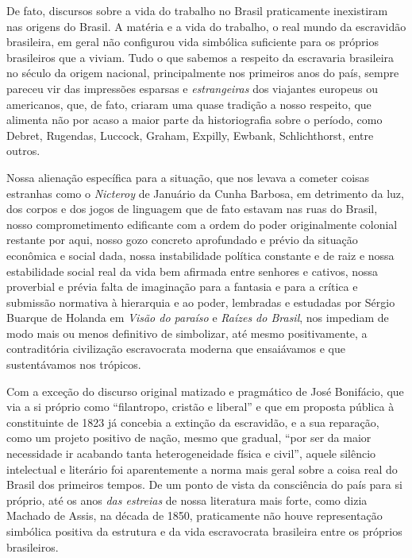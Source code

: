 De fato, discursos sobre a vida do trabalho no Brasil praticamente
inexistiram nas origens do Brasil. A matéria e a vida do trabalho, o
real mundo da escravidão brasileira, em geral não configurou vida
simbólica suficiente para os próprios brasileiros que a viviam. Tudo o
que sabemos a respeito da escravaria brasileira no século da origem
nacional, principalmente nos primeiros anos do país, sempre pareceu vir
das impressões esparsas e \emph{estrangeiras} dos viajantes europeus ou
americanos, que, de fato, criaram uma quase tradição a nosso respeito,
que alimenta não por acaso a maior parte da historiografia sobre o
período, como Debret, Rugendas, Luccock, Graham, Expilly, Ewbank,
Schlichthorst, entre outros.

Nossa alienação específica para a situação, que nos levava a cometer
coisas estranhas como o \emph{Nicteroy} de Januário da Cunha Barbosa, em
detrimento da luz, dos corpos e dos jogos de linguagem que de fato
estavam nas ruas do Brasil, nosso comprometimento edificante com a ordem
do poder originalmente colonial restante por aqui, nosso gozo concreto
aprofundado e prévio da situação econômica e social dada, nossa
instabilidade política constante e de raiz e nossa estabilidade social
real da vida bem afirmada entre senhores e cativos, nossa proverbial e
prévia falta de imaginação para a fantasia e para a crítica e submissão
normativa à hierarquia e ao poder, lembradas e estudadas por Sérgio
Buarque de Holanda em \emph{Visão do paraíso} e \emph{Raízes do Brasil},
nos impediam de modo mais ou menos definitivo de simbolizar, até mesmo
positivamente, a contraditória civilização escravocrata moderna que
ensaiávamos e que sustentávamos nos trópicos.

Com a exceção do discurso original matizado e pragmático de José
Bonifácio, que via a si próprio como ``filantropo, cristão e liberal'' e
que em proposta pública à constituinte de 1823 já concebia a extinção da
escravidão, e a sua reparação, como um projeto positivo de nação, mesmo
que gradual, ``por ser da maior necessidade ir acabando tanta
heterogeneidade física e civil'', aquele silêncio intelectual e
literário foi aparentemente a norma mais geral sobre a coisa real do
Brasil dos primeiros tempos. De um ponto de vista da consciência do país
para si próprio, até os anos \emph{das estreias} de nossa literatura
mais forte, como dizia Machado de Assis, na década de 1850, praticamente
não houve representação simbólica positiva da estrutura e da vida
escravocrata brasileira entre os próprios brasileiros.

